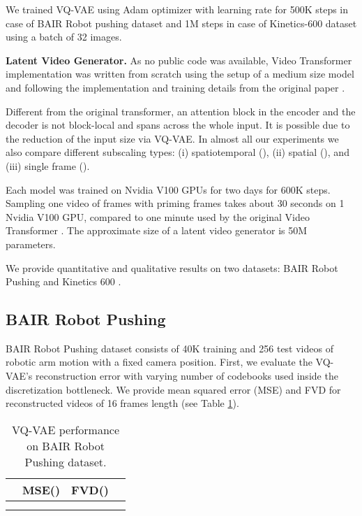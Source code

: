\documentclass{article}
\begin{document}
We trained VQ-VAE using Adam optimizer with learning rate  for 500K steps in case of BAIR Robot pushing dataset and 1M steps in case of Kinetics-600 dataset using a batch of 32 images.

\textbf{Latent Video Generator.} As no public code was available, Video Transformer implementation was written from scratch using the setup of a medium size model and following the implementation and training details from the original paper \cite{vt}.

Different from the original transformer, an attention block in the encoder and the decoder is not block-local and spans across the whole input. It is possible due to the reduction of the input size via VQ-VAE. In almost all our experiments we also compare different subscaling types: (i) spatiotemporal (), (ii) spatial (), and (iii) single frame ().

Each model was trained on  Nvidia V100 GPUs for two days for 600K steps. Sampling one video of  frames with  priming frames takes about 30 seconds on 1 Nvidia V100 GPU, compared to one minute used by the original Video Transformer \cite{vt}. The approximate size of a latent video generator is 50M parameters.

We provide quantitative and qualitative results on two datasets: BAIR Robot Pushing \cite{bair_dataset} and Kinetics 600 \cite{kinetics600_dataset}.














\subsection{BAIR Robot Pushing}

BAIR Robot Pushing \cite{bair_dataset} dataset consists of 40K training and 256 test videos of robotic arm motion with a fixed camera position. First, we evaluate the VQ-VAE's reconstruction error with varying number of codebooks used inside the discretization bottleneck. We provide mean squared error (MSE) and FVD for reconstructed videos of 16 frames length (see Table \ref{table:BAIRvqvae}).

\begin{table}[!hbtp]
\centering
\caption{VQ-VAE performance on BAIR Robot Pushing dataset.}
\begin{tabular}{lccc}
\hline
                  & \textbf{MSE}() & \textbf{FVD}()     \\ \hline
 &  &  \\
 &  &  \\ \hline
\end{tabular}
\label{table:BAIRvqvae}
\end{table}
\end{document}
